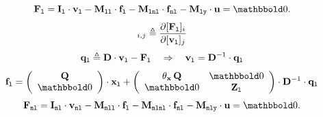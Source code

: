 \documentclass[10pt,a4paper]{article}
\begin{document}
\begin{equation}
\mat F_{\lab l} = \mat{I}_{\lab l}\cdot\vvl - \M{ll}\cdot\vfl- \M{lnl}\cdot\vfnl- \M{ly}\cdot\vu = \zeros.
\end{equation}
%
\begin{equation}
[\mat D]_{i,j} \triangleq \frac{\partial [\mat F_{\lab l}]_i}{\partial [\vvl]_j}
\end{equation}
%
\begin{equation}
\mathbf{q}_{\mathtt{l}} \triangleq \mathbf{D}\cdot {\mathbf{v}_{\mathtt{l}}} - \mathbf{F}_{\mathtt{l}}\quad \Rightarrow\quad {\mathbf{v}_{\mathtt{l}}} = \mathbf{D}^{-1}\cdot\mathbf{q}_{\mathtt{l}}
\end{equation}
%
\begin{equation}
\vfl = \left( \begin{array}{c}
\Q\\
\zeros
\end{array}\right)\cdot\vxl + \left(\begin{array}{cc}
\theta_\vx\,\Q& \zeros\\
\zeros & \Z{l}
\end{array}\right)\cdot\mat D ^{-1}\cdot\vec{q}_{\lab l}
\end{equation}
%
\begin{equation}
\mat F_{\lab{nl}} = \mat{I}_{\lab{nl}}\cdot\vvnl - \M{nll}\cdot\vfl- \M{nlnl}\cdot\vfnl- \M{nly}\cdot\vu = \zeros.
\end{equation}
%
\end{document}
